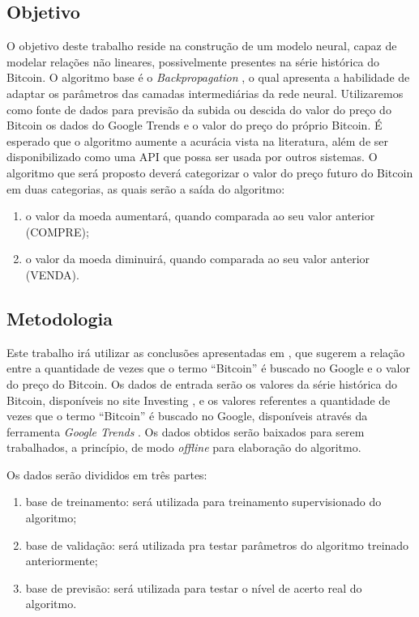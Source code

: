 \subsection{Objetivo}
O objetivo deste trabalho reside na construção de um modelo neural, capaz de modelar relações não lineares, possivelmente presentes na série histórica do Bitcoin. O algoritmo base é o \emph{Backpropagation} \cite{hecht1992theory}, o qual apresenta a habilidade de adaptar os parâmetros das camadas intermediárias da rede neural. Utilizaremos como fonte de dados para previsão da subida ou descida do valor do preço do Bitcoin os dados do Google Trends e o valor do preço do próprio Bitcoin. É esperado que o algoritmo aumente a acurácia vista na literatura, além de ser disponibilizado como uma API que possa ser usada por outros sistemas. O algoritmo que será proposto deverá categorizar o valor do preço futuro do Bitcoin em duas categorias, as quais serão a saída do algoritmo:
\begin{enumerate}
\item o valor da moeda aumentará, quando comparada ao seu valor anterior (COMPRE);
\item o valor da moeda diminuirá, quando comparada ao seu valor anterior (VENDA).
\end{enumerate}

\subsection{Metodologia}

Este trabalho irá utilizar as conclusões apresentadas em  \cite{matta2015bitcoin, mcnally2016predicting,weigend2018time}, que sugerem a relação entre a quantidade de vezes que o termo ``Bitcoin'' é buscado no Google e o valor do preço do Bitcoin. Os dados de entrada serão os valores da série histórica do Bitcoin, disponíveis no site Investing \cite{Investing}, e os valores referentes a quantidade de vezes que o termo ``Bitcoin'' é buscado no Google, disponíveis através da ferramenta \textit{Google Trends} \cite{GoogleTrends}. Os dados obtidos serão baixados para serem trabalhados, a princípio, de modo \textit{offline} para elaboração do algoritmo.

Os dados serão divididos em três partes:
\begin{enumerate}
\item base de treinamento: será utilizada para treinamento supervisionado do algoritmo;
\item base de validação: será utilizada pra testar parâmetros do algoritmo treinado anteriormente;
\item base de previsão: será utilizada para testar o nível de acerto real do algoritmo.
\end{enumerate}

